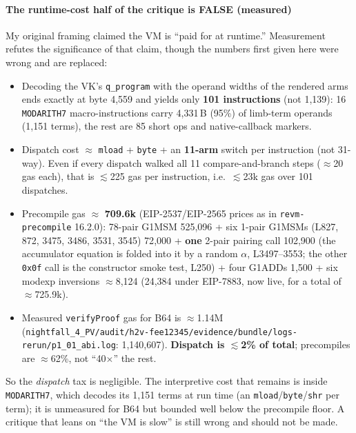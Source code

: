 \paragraph{The runtime-cost half of the critique is FALSE (measured)} 
My original framing claimed the VM is ``paid for at runtime.''
Measurement refutes the significance of that claim, though the
numbers first given here were wrong and are replaced:
\begin{itemize}[leftmargin=1.4em,itemsep=2pt]
\item Decoding the VK's \texttt{q\_program} with the operand widths
  of the rendered arms ends exactly at byte 4{,}559 and yields only
  \textbf{101 instructions} (not 1{,}139): 16 \texttt{MODARITH7}
  macro-instructions carry 4{,}331\,B (95\%) of limb-term operands
  (1{,}151 terms), the rest are 85 short ops and native-callback
  markers.
\item Dispatch cost $\approx$ \texttt{mload} + \texttt{byte} + an
  \textbf{11-arm} switch per instruction (not 31-way). Even if every
  dispatch walked all 11 compare-and-branch steps
  ($\approx$20 gas each), that is $\lesssim$225 gas per instruction,
  i.e.\ $\lesssim$23k gas over 101 dispatches.
\item Precompile gas $\approx$ \textbf{709.6k} (EIP-2537/EIP-2565
  prices as in \texttt{revm-precompile} 16.2.0): 78-pair G1MSM
  525{,}096 + six 1-pair G1MSMs (L827, 872, 3475, 3486, 3531, 3545)
  72{,}000 + \textbf{one} 2-pair
  pairing call 102{,}900 (the accumulator equation is folded into
  it by a random $\alpha$, L3497--3553; the other \texttt{0x0f} call
  is the constructor smoke test, L250) + four G1ADDs 1{,}500 + six
  modexp inversions $\approx$8{,}124 (24{,}384 under EIP-7883, now live,
  for a total of $\approx$725.9k).
\item Measured \texttt{verifyProof} gas for B64 is $\approx$1.14M
  (\texttt{nightfall\_\allowbreak{}4\_\allowbreak{}PV/\allowbreak{}audit/\allowbreak{}h2v-fee12345/\allowbreak{}evidence/\allowbreak{}bundle/\allowbreak{}logs-rerun/\allowbreak{}p1\_\allowbreak{}01\_\allowbreak{}abi.log}:
  1{,}140{,}607). \textbf{Dispatch is $\lesssim$2\% of total}; precompiles
  are $\approx$62\%, not ``40$\times$'' the rest.
\end{itemize}
So the \emph{dispatch} tax is negligible. The interpretive cost
that remains is inside \texttt{MODARITH7}, which decodes its 1{,}151
terms at run time (an \texttt{mload}/\texttt{byte}/\texttt{shr}
per term); it is unmeasured for B64 but bounded well below the
precompile floor. A critique that leans on ``the VM is slow'' is
still wrong and should not be made.

